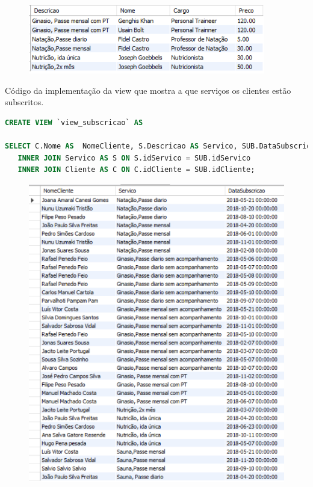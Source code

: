 \begin{figure}[h]
\begin{center}
\includegraphics[scale=1.0]{implementacao_fisica/Prestaservico.png}
\centering
\end{center}
\end{figure}
\clearpage
Código da implementação da view que mostra a que serviços os clientes estão subscritos.
\begin{lstlisting}[language=SQL]
CREATE VIEW `view_subscricao` AS

SELECT C.Nome AS  NomeCliente, S.Descricao AS Servico, SUB.DataSubscricao FROM Subscreve AS SUB
   INNER JOIN Servico AS S ON S.idServico = SUB.idServico
   INNER JOIN Cliente AS C ON C.idCliente = SUB.idCliente;
\end{lstlisting}
\begin{figure}[h]
\begin{center}
\includegraphics[scale=1.0]{implementacao_fisica/Susbricao.png}
\centering
\end{center}
\end{figure}
\clearpage
